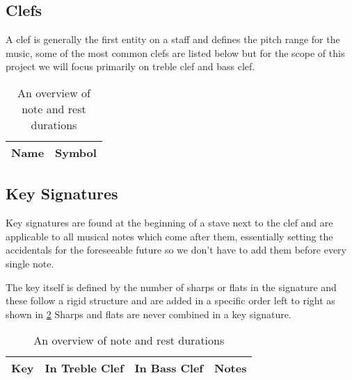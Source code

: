 \subsection{Clefs}
\label{sec:music-theory-clefs}

A clef is generally the first entity on a staff and defines the pitch range for the music, some of the most common clefs are listed below but for the scope of this project we will focus primarily on treble clef and bass clef.

\begin{table}[H]
    \renewcommand{\arraystretch}{1.8}
    \centering
    \begin{tabularx}{\textwidth}{ l l }
        \toprule
        Name & Symbol \\
        \midrule

        \bottomrule
    \end{tabularx}
    \caption{An overview of note and rest durations}
    \label{table:clefs}
\end{table}

\subsection{Key Signatures}
\label{sec:music-theory-key-signatures}

Key signatures are found at the beginning of a stave next to the clef and are applicable to all musical notes which come after them, essentially setting the accidentals for the foreseeable future so we don't have to add them before every single note.

The key itself is defined by the number of sharps or flats in the signature and these follow a rigid structure and are added in a specific order left to right as shown in \cref{table:key-signatures} Sharps and flats are never combined in a key signature.


\begin{table}[H]
    \renewcommand{\arraystretch}{1.8}
    \centering
    \begin{tabularx}{\textwidth}{ l l l XXXXXXX }
        \toprule
        Key & In Treble Clef & In Bass Clef & \multicolumn{7}{c}{Notes} \\
        \midrule

        \bottomrule
    \end{tabularx}
    \caption{An overview of note and rest durations}
    \label{table:key-signatures}
\end{table}



